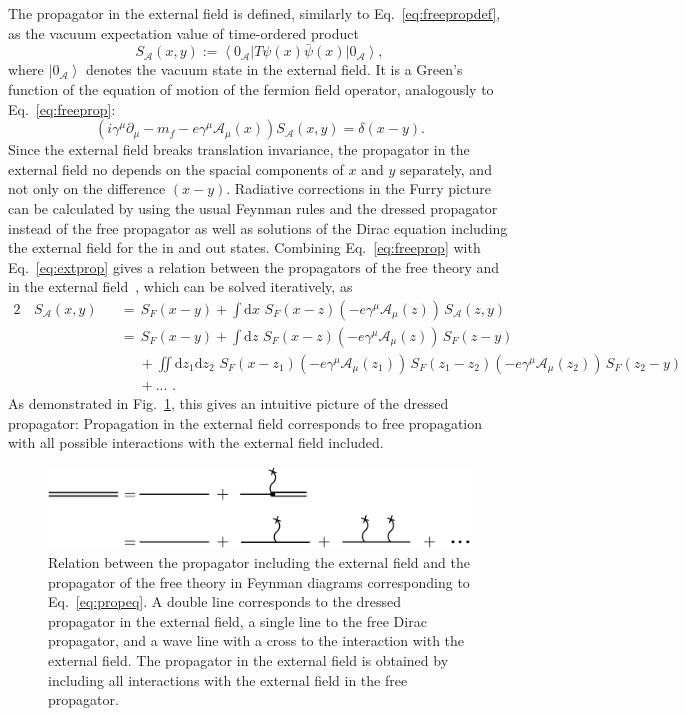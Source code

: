 The propagator in the external field is defined, similarly to Eq.~\eqref{eq:freepropdef}, as the vacuum expectation value of time-ordered product
\begin{equation}
S_{\mathcal{A}}(x,y):=\left<0_\mathcal{A}\right|T\psi(x)\bar{\psi}(x) \left|0_\mathcal{A}\right>,
\label{eq:extpropdef}
\end{equation}
where $\left|0_\mathcal{A}\right>$ denotes the vacuum state in the external field.
It is a Green's function of the equation of motion of the fermion field operator, analogously to Eq.~\eqref{eq:freeprop}:
\begin{equation}
\left(i\gamma^\mu \partial_\mu -m_f - e \gamma^\mu \mathcal{A}_\mu(x)\right)S_{\mathcal{A}}(x,y)=\delta(x-y).
\label{eq:extprop}
\end{equation}
Since the external field breaks translation invariance, the propagator in the external field no depends on the spacial components of $x$ and $y$ separately, and not only on the difference $(x-y)$. Radiative corrections in the Furry picture can be calculated by using the usual Feynman rules and the dressed propagator instead of the free propagator as well as solutions of the Dirac equation including the external field for the in and out states. Combining Eq.~\eqref{eq:freeprop} with Eq.~\eqref{eq:extprop} gives a relation between the propagators of the free theory and in the external field~\mbox{\cite[Section 2.5.]{itzykson2005}}, which can be solved iteratively, as
\begin{alignat}{2}
&\,S_{\mathcal{A}}(x,y)&&= \,S_F(x-y) 
+ \int\mathrm{d}x\, \,S_F(x-z)\left(-e\gamma^\mu \mathcal{A}_\mu(z)\right)\,S_{\mathcal{A}}(z,y)\\
& &&=\,S_F(x-y)+\int\mathrm{d}z\,\,S_F(x-z)(-e\gamma^\mu \mathcal{A}_\mu(z))\,S_F(z-y)\\
&&&\phantom{=}+\iint\mathrm{d}z_1\mathrm{d}z_2\,\,S_F(x-z_1)(-e\gamma^\mu \mathcal{A}_\mu(z_1))\,S_F(z_1-z_2)(-e\gamma^\mu \mathcal{A}_\mu(z_2))\,S_F(z_2-y)\\
&&&\phantom{=}+...\,\,.\label{eq:propeq}
\end{alignat}
As demonstrated in Fig.~\ref{fig:propagator}, this gives an intuitive picture of the dressed propagator: Propagation in the external field corresponds to free propagation with all possible interactions with the external field included.
%
\begin{figure}%
\centering
\includegraphics[width=0.9\linewidth]{pics/propagator.pdf}%
\caption{Relation between the propagator including the external field and the propagator of the free theory in Feynman diagrams corresponding to Eq.~\eqref{eq:propeq}. A double line corresponds to the dressed propagator in the external field, a single line to the free Dirac propagator, and a wave line with a cross to the interaction with the external field. The propagator in the external field is obtained by including all interactions with the external field in the free propagator.}%
\label{fig:propagator}%
\end{figure}
